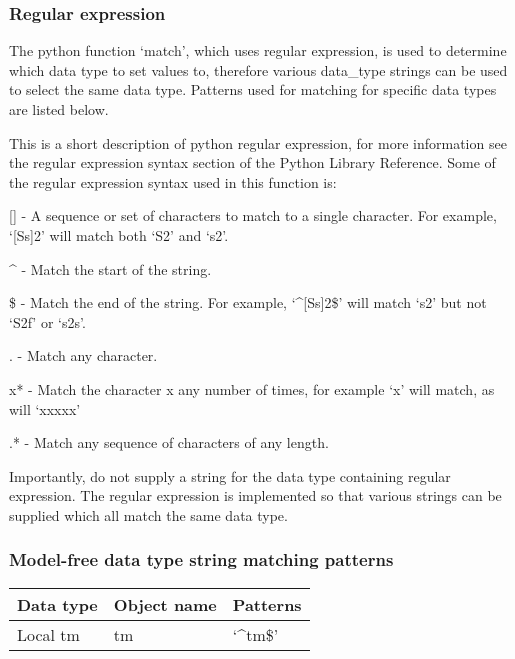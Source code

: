 \subsubsection{Regular expression}

The python function `match', which uses regular expression, is used to determine which data
type to set values to, therefore various data\_type strings can be used to select the same
data type.  Patterns used for matching for specific data types are listed below.

This is a short description of python regular expression, for more information see the
regular expression syntax section of the Python Library Reference.  Some of the regular
expression syntax used in this function is:

    [] - A sequence or set of characters to match to a single character.  For example,
    `[Ss]2' will match both `S2' and `s2'.

    \^{} - Match the start of the string.

    \$ - Match the end of the string.  For example, `\^{}[Ss]2\$' will match `s2' but not `S2f'
    or `s2s'.

    . - Match any character.

    x* - Match the character x any number of times, for example `x' will match, as will
    `xxxxx'

    .* - Match any sequence of characters of any length.

Importantly, do not supply a string for the data type containing regular expression.  The
regular expression is implemented so that various strings can be supplied which all match
the same data type.


\subsubsection{Model-free data type string matching patterns}



\begin{center}
\begin{tabular}{lll}
\toprule
Data type & Object name & Patterns \\
\midrule
 Local tm                &  tm            &  `\^{}tm\$'                                            \\
\bottomrule
\end{tabular}
\end{center}


